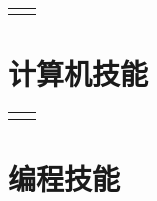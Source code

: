 \documentclass[10pt]{article} %
\begin{document}
\begin{paracol}{2}
\begin{supertabular}{rl}
		
		
		
	\end{supertabular}
	
	\section{计算机技能}
	
	\begin{supertabular}{rl} %
		
		
		
		
		
		
		
	\end{supertabular}
	
	
	\section{编程技能} 
	
	
	
	
	
	\begin{supertabular}{rl} %
		

\end{supertabular}
\end{paracol}
\end{document}
